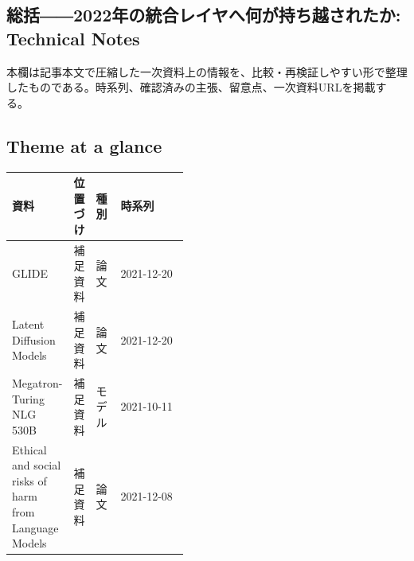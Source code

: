 \subsection*{総括――2022年の統合レイヤへ何が持ち越されたか: Technical Notes}
本欄は記事本文で圧縮した一次資料上の情報を、比較・再検証しやすい形で整理したものである。時系列、確認済みの主張、留意点、一次資料URLを掲載する。
\smallskip
{}\par
\medskip
\subsection*{Theme at a glance}
\begin{center}
\footnotesize
\begin{tabularx}{\linewidth}{@{}p{0.20\linewidth}p{0.10\linewidth}p{0.14\linewidth}X@{}}
\toprule
資料 & 位置づけ & 種別 & 時系列 \\
\midrule
GLIDE & 補足資料 & 論文 & 2021-12-20 \\
Latent Diffusion Models & 補足資料 & 論文 & 2021-12-20 \\
Megatron-Turing NLG 530B & 補足資料 & モデル & 2021-10-11 \\
Ethical and social risks of harm from Language Models & 補足資料 & 論文 & 2021-12-08 \\
\bottomrule
\end{tabularx}
\end{center}
\normalsize

